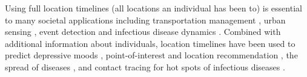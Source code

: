 

Using full location timelines (all locations an individual has been to) is essential to many societal applications including transportation management \cite{li2017urban,53}, urban sensing \cite{109}, event detection \cite{aoki2017early} and infectious disease dynamics \cite{32}. Combined with additional information about individuals, location timelines have been used to predict depressive moods \cite{107}, point-of-interest and location recommendation \cite{zhang2014lore,bao2012location}, the spread of diseases \cite{liu2015multi}, and contact tracing for hot spots of infectious diseases \cite{126}. 

